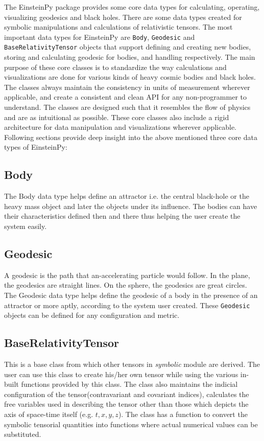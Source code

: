 \documentclass[onecolumn]{aa}
\begin{document}
  The EinsteinPy package provides some core data types for calculating, 
  operating, visualizing geodesics and black holes. There are some data 
  types created for symbolic manipulations and calculations of relativistic 
  tensors. The most important data types for EinsteinPy are \texttt{Body}, 
  \texttt{Geodesic} and \texttt{BaseRelativityTensor} objects that support 
  defining and creating new bodies, storing and calculating geodesic for 
  bodies, and handling respectively. The main purpose of these core classes 
  is to standardize the way calculations and visualizations are done for 
  various kinds of heavy cosmic bodies and black holes. The classes always 
  maintain the consistency in units of measurement wherever applicable, and 
  create a consistent and clean API for any non-programmer to understand. 
  The classes are designed such that it resembles the flow of physics and 
  are as intuitional as possible. These core classes also include a rigid 
  architecture for data manipulation and visualizations wherever applicable. 
  Following sections provide deep insight into the above mentioned three 
  core data types of EinsteinPy:
  
  \subsection{Body}
  The Body data type helps define an attractor i.e. the central black-hole 
  or the heavy mass object and later the objects under its influence. 
  The bodies can have their characteristics defined then and there thus 
  helping the user create the system easily. 
  
  \subsection{Geodesic}
  A geodesic is the path that an-accelerating particle would follow. 
  In the plane, the geodesics are straight lines. On the sphere, the 
  geodesics are great circles. The Geodesic data type helps define the 
  geodesic of a body in the presence of an attractor or more aptly, 
  according to the system user created. These \texttt{Geodesic} objects 
  can be defined for any configuration and metric. 
  
  \subsection{BaseRelativityTensor}
  This is a base class from which other tensors in \textit{symbolic} 
  module are derived. The user can use this class to create his/her 
  own tensor while using the various in-built functions provided by this 
  class. The class also maintains the indicial configuration of 
  the tensor(contravariant and covariant indices), calculates the 
  free variables used in describing the tensor other than those which 
  depicts the axis of space-time itself (e.g. $t, x, y, z$). The class 
  has a function to convert the symbolic tensorial quantities into 
  functions where actual numerical values can be substituted.
\end{document}

